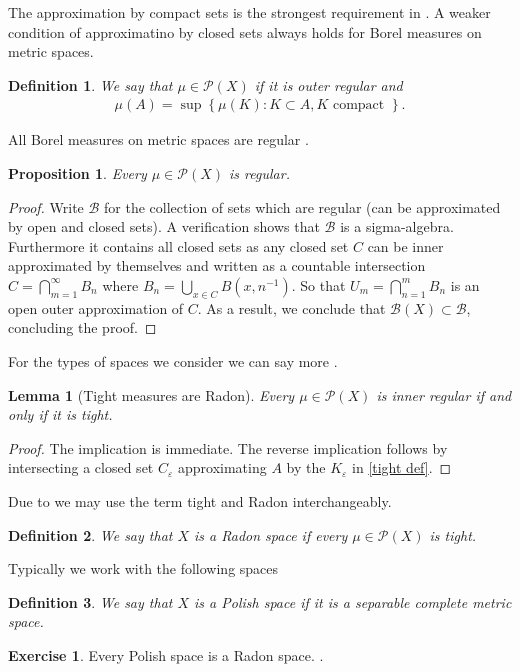 \documentclass[
    a4paper,
    DIV=14,
    abstract=true,
    numbers=noenddot
]
{scrartcl}
\newtheorem{proposition}[proposition]{Proposition}
\newtheorem{lemma}[lemma]{Lemma}
\newtheorem{definition}[definition]{Definition}
\theoremstyle{definition}
\newtheorem{exercise}{Exercise}
\newcommand{\eps}{\varepsilon}
\newcommand{\set}[1]{\left\{#1\right\}}
\newcommand{\Bb}{\mathcal{B}}
\newcommand{\Pp}{\mathcal{P}}
\begin{document}
The approximation by compact sets is the strongest requirement in . A weaker condition of approximatino by closed sets always holds for Borel measures on metric spaces.
\begin{definition}
    We say that $\mu \in \Pp(X)$ if it is outer regular and
    \begin{align*}
        \mu (A)= \sup \set{ \mu (K): K \subset A, K \text{ compact } }.
    \end{align*}
\end{definition}
All Borel measures on metric spaces are regular  \cite[Theorem 1.2, p.27]{parthasarathy1967probability}.
\begin{proposition}
    Every $ \mu \in \Pp(X)$ is regular.
\end{proposition}
\begin{proof}
    Write $\Bb $ for the collection of sets which are regular (can be approximated by open and closed sets). A verification shows that $\Bb $ is a sigma-algebra. Furthermore it contains all closed sets as any closed set $C$  can be inner approximated by themselves and written as a countable intersection $C = \bigcap_{m=1}^ \infty B_n $ where $B_n = \bigcup_{x \in C} B(x,n ^{-1})$. So that $U_m= \bigcap_{n=1}^m B_n$ is an open outer approximation of $C$. As a result, we conclude that $\Bb (X) \subset \Bb $, concluding the proof.
\end{proof}
For the types of spaces we consider we can say more \cite[Theorem 3.1, p.29]{parthasarathy1967probability}.
\begin{lemma}[Tight measures are Radon]\label{tight is Radon}
    Every $ \mu \in \Pp(X)$ is inner regular if and only if it is tight.
\end{lemma}
\begin{proof}
    The implication is immediate. The reverse implication follows by intersecting a closed set $C_\eps $ approximating $A$ by the $K_\eps $ in \eqref{tight def}.
\end{proof}
Due to  we may use the term tight and Radon interchangeably.
\begin{definition}
    We say that $X$ is a Radon space if every $\mu \in \Pp(X)$ is tight.
\end{definition}
Typically we work with the following spaces
\begin{definition}
    We say that $X$ is a \emph{Polish space} if it is a separable complete metric space.
\end{definition}
\begin{exercise}
    Every Polish space is a Radon space.  \cite[Theorem 1.3, p.9]{billingsley2013convergence}.
\end{exercise}
\end{document}
